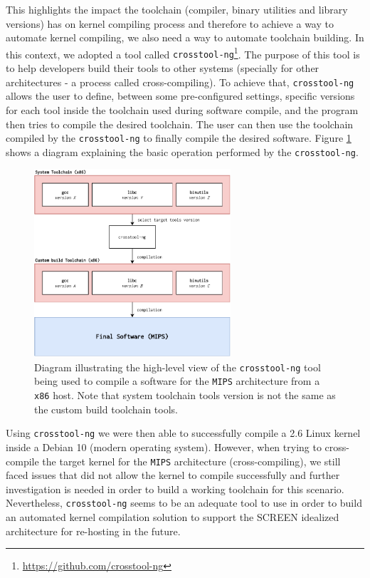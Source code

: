 This highlights the impact the toolchain (compiler, binary utilities and library versions) has on kernel compiling process and therefore to achieve a way to automate kernel compiling, we also need a way to automate toolchain building. In this context, we adopted a tool called {\tt crosstool-ng}\footnote{\url{https://github.com/crosstool-ng}}. The purpose of this tool is to help developers build their tools to other systems (specially for other architectures - a process called cross-compiling). To achieve that, {\tt crosstool-ng} allows the user to define, between some pre-configured settings, specific versions for each tool inside the toolchain used during software compile, and the program then tries to compile the desired toolchain. The user can then use the toolchain compiled by the {\tt crosstool-ng} to finally compile the desired software. Figure \ref{fig:crosstool} shows a diagram explaining the basic operation performed by the {\tt crosstool-ng}.

\begin{figure}[H]
    \centering
    \includegraphics[width=0.65\textwidth]{figs/crosstool.pdf}
    \caption{Diagram illustrating the high-level view of the {\tt crosstool-ng} tool being used to compile a software for the {\tt MIPS} architecture from a {\tt x86} host. Note that system toolchain tools version is not the same as the custom build toolchain tools.}
    \label{fig:crosstool}
\end{figure}

Using {\tt crosstool-ng} we were then able to successfully compile a 2.6 Linux kernel inside a Debian 10 (modern operating system). However, when trying to cross-compile the target kernel for the {\tt MIPS} architecture (cross-compiling), we still faced issues that did not allow the kernel to compile successfully and further investigation is needed in order to build a working toolchain for this scenario. Nevertheless, {\tt crosstool-ng} seems to be an adequate tool to use in order to build an automated kernel compilation solution to support the SCREEN idealized architecture for re-hosting in the future.

